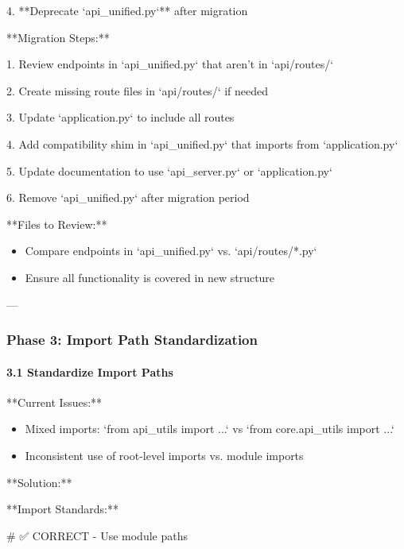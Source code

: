 \documentclass[11pt,a4paper]{article}
\begin{document}
4. **Deprecate `api\_unified.py`** after migration

**Migration Steps:**

1. Review endpoints in `api\_unified.py` that aren't in `api/routes/`

2. Create missing route files in `api/routes/` if needed

3. Update `application.py` to include all routes

4. Add compatibility shim in `api\_unified.py` that imports from `application.py`

5. Update documentation to use `api\_server.py` or `application.py`

6. Remove `api\_unified.py` after migration period

**Files to Review:**

\begin{itemize}
\item Compare endpoints in `api_unified.py` vs. `api/routes/*.py`
\end{itemize}

\begin{itemize}
\item Ensure all functionality is covered in new structure
\end{itemize}

---

\subsubsection{Phase 3: Import Path Standardization}

\paragraph{3.1 Standardize Import Paths}

**Current Issues:**

\begin{itemize}
\item Mixed imports: `from api_utils import ...` vs `from core.api_utils import ...`
\end{itemize}

\begin{itemize}
\item Inconsistent use of root-level imports vs. module imports
\end{itemize}

**Solution:**

**Import Standards:**

\# ✅ CORRECT - Use module paths
\end{document}
